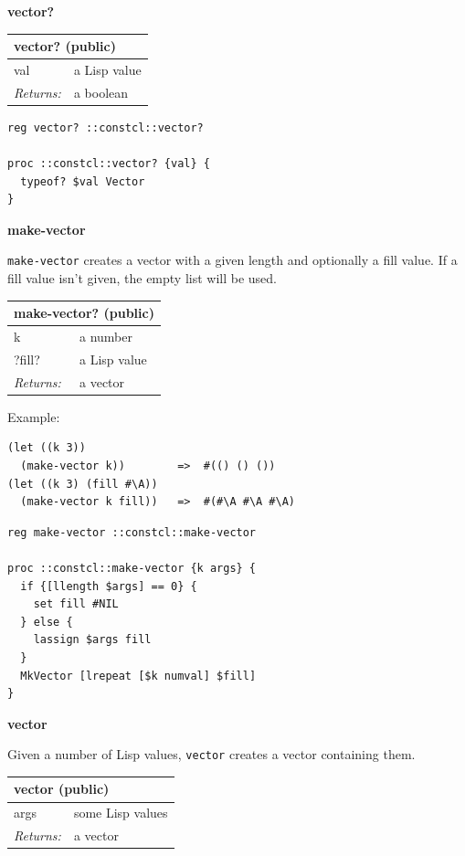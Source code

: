 \documentclass[twoside,9pt]{report}
\begin{document}
\textbf{vector?}

\begin{tabular}{ |l l| }
\hline
\multicolumn{2}{|l|}{vector? (public)} \\
\hline
val & a Lisp value \\
\textit{Returns:} & a boolean \\
\hline
\end{tabular}

\noindent\makebox[\linewidth]{\rule{\linewidth}{0.4pt}}
\begin{lstlisting}
reg vector? ::constcl::vector?
 
proc ::constcl::vector? {val} {
  typeof? $val Vector
}
\end{lstlisting}
\noindent\makebox[\linewidth]{\rule{\linewidth}{0.4pt}}

\textbf{make-vector}


\texttt{make-vector} creates a vector with a given length and optionally a fill value. If a fill value isn't given, the empty list will be used.

\begin{tabular}{ |l l| }
\hline
\multicolumn{2}{|l|}{make-vector? (public)} \\
\hline
k & a number \\
?fill? & a Lisp value \\
\textit{Returns:} & a vector \\
\hline
\end{tabular}


Example:

\noindent\makebox[\linewidth]{\rule{\linewidth}{0.4pt}}
\begin{lstlisting}
(let ((k 3))
  (make-vector k))        =>  #(() () ())
(let ((k 3) (fill #\A))
  (make-vector k fill))   =>  #(#\A #\A #\A)
\end{lstlisting}
\noindent\makebox[\linewidth]{\rule{\linewidth}{0.4pt}}
\noindent\makebox[\linewidth]{\rule{\linewidth}{0.4pt}}
\begin{lstlisting}
reg make-vector ::constcl::make-vector
 
proc ::constcl::make-vector {k args} {
  if {[llength $args] == 0} {
    set fill #NIL
  } else {
    lassign $args fill
  }
  MkVector [lrepeat [$k numval] $fill]
}
\end{lstlisting}
\noindent\makebox[\linewidth]{\rule{\linewidth}{0.4pt}}

\textbf{vector}


Given a number of Lisp values, \texttt{vector} creates a vector containing them.

\begin{tabular}{ |l l| }
\hline
\multicolumn{2}{|l|}{vector (public)} \\
\hline
args & some Lisp values \\
\textit{Returns:} & a vector \\
\hline
\end{tabular}
\end{document}
